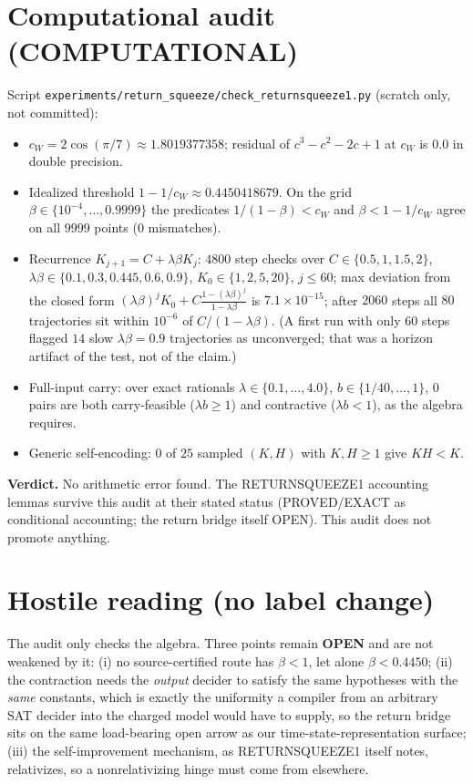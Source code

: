 \documentclass[11pt]{article}
\begin{document}
\section*{Computational audit (COMPUTATIONAL)}
Script \texttt{experiments/return\_squeeze/check\_returnsqueeze1.py} (scratch only, not committed):
\begin{itemize}
\item $c_W=2\cos(\pi/7)\approx1.8019377358$; residual of $c^3-c^2-2c+1$ at $c_W$ is $0.0$ in double precision.
\item Idealized threshold $1-1/c_W\approx0.4450418679$. On the grid $\beta\in\{10^{-4},\dots,0.9999\}$ the
predicates $1/(1-\beta)<c_W$ and $\beta<1-1/c_W$ agree on all $9999$ points ($0$ mismatches).
\item Recurrence $K_{j+1}=C+\lambda\beta K_j$: $4800$ step checks over $C\in\{0.5,1,1.5,2\}$,
$\lambda\beta\in\{0.1,0.3,0.445,0.6,0.9\}$, $K_0\in\{1,2,5,20\}$, $j\le60$; max deviation from the closed form
$(\lambda\beta)^jK_0+C\frac{1-(\lambda\beta)^j}{1-\lambda\beta}$ is $7.1\times10^{-15}$; after $2060$ steps all
$80$ trajectories sit within $10^{-6}$ of $C/(1-\lambda\beta)$. (A first run with only $60$ steps flagged
$14$ slow $\lambda\beta{=}0.9$ trajectories as unconverged; that was a horizon artifact of the test, not of
the claim.)
\item Full-input carry: over exact rationals $\lambda\in\{0.1,\dots,4.0\}$, $b\in\{1/40,\dots,1\}$,
$0$ pairs are both carry-feasible ($\lambda b\ge1$) and contractive ($\lambda b<1$), as the algebra requires.
\item Generic self-encoding: $0$ of $25$ sampled $(K,H)$ with $K,H\ge1$ give $KH<K$.
\end{itemize}
\textbf{Verdict.} No arithmetic error found. The RETURNSQUEEZE1 accounting lemmas survive this audit at
their stated status (PROVED/EXACT as conditional accounting; the return bridge itself OPEN).
This audit does not promote anything.

\section*{Hostile reading (no label change)}
The audit only checks the algebra. Three points remain \textbf{OPEN} and are not weakened by it:
(i) no source-certified route has $\beta<1$, let alone $\beta<0.4450$; (ii) the contraction needs the
\emph{output} decider to satisfy the same hypotheses with the \emph{same} constants, which is exactly the
uniformity a compiler from an arbitrary SAT decider into the charged model would have to supply, so the
return bridge sits on the same load-bearing open arrow as our time-state-representation surface;
(iii) the self-improvement mechanism, as RETURNSQUEEZE1 itself notes, relativizes, so a nonrelativizing
hinge must come from elsewhere.
\end{document}
